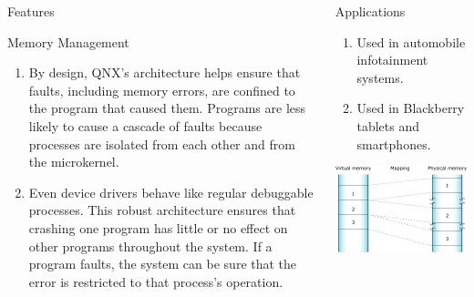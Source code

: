 \documentclass[final]{beamer}
\newlength{\onecolwid}
\newlength{\twocolwid}
\begin{document}
\begin{frame}[t]
\begin{columns}[t]
\begin{column}{\twocolwid}
\begin{columns}[t,totalwidth=\twocolwid]
\begin{column}{\onecolwid}
\begin{block}{Features}
\end{block}


\begin{block}{Memory Management}
\begin{enumerate}
    \item By design, QNX's architecture helps ensure that faults, including memory errors, are confined to the program that caused them. Programs are less likely to cause a cascade of faults because processes are isolated from each other and from the microkernel. 
    \item Even device drivers behave like regular debuggable processes. This robust architecture ensures that crashing one program has little or no effect on other programs throughout the system. If a program faults, the system can be sure that the error is restricted to that process's operation. 
\end{enumerate}

\end{block}


\end{column} %

\begin{column}{\onecolwid}\vspace{-.6in} %

\begin{block}{Applications}

\begin{enumerate}
\item Used in automobile infotainment systems. 
\item Used in Blackberry tablets and smartphones.
\end{enumerate}

\vspace{10mm}
\vfill

\begin{center}
 \includegraphics[width=20cm]{qnx_memory.jpg}\\
 \caption{Fig. 4 : Memory Management in QNX}
\end{center}


\end{block}
\end{column}
\end{columns}
\end{column}
\end{columns}
\end{frame}
\end{document}
